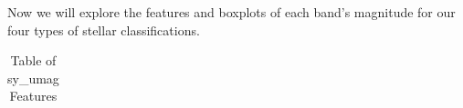 \documentclass[
  letterpaper,
  DIV=11,
  numbers=noendperiod]{scrartcl}
\begin{document}
Now we will explore the features and boxplots of each band's magnitude
for our four types of stellar classifications.

\begin{longtable}[]{@{}
  >{\raggedright\arraybackslash}p{}
  >{\raggedright\arraybackslash}p{}
  >{\raggedright\arraybackslash}p{}
  >{\raggedright\arraybackslash}p{}
  >{\raggedright\arraybackslash}p{}
  >{\raggedright\arraybackslash}p{}
  >{\raggedright\arraybackslash}p{}
  >{\raggedright\arraybackslash}p{}
  >{\raggedright\arraybackslash}p{}@{}}

\caption{\label{tbl-sy-umag}Table of sy\_umag Features}

\tabularnewline


\end{longtable}
\end{document}
